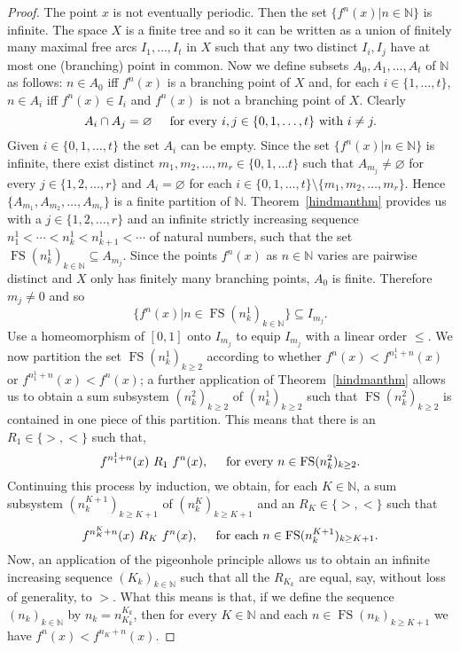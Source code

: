 \documentclass[12pt]{amsart}
\theoremstyle{definition}
\numberwithin{equation}{section}
\DeclareMathOperator{\fs}{FS}
\begin{document}
\begin{proof}
 The point $x$ is not eventually periodic. Then the set $\{f^n(x)\big|n\in\mathbb N\}$ is infinite. The space $X$ is a finite tree and so it can be written as a union of finitely many maximal free arcs $I_1,\ldots,I_t$
 in $X$ such that any two distinct $I_i,I_j$ have at most one (branching) point in common. Now we define subsets $A_0,A_1,\ldots,A_t$ of $\mathbb N$ as follows: $n\in A_0$ iff $f^n(x)$ is a branching point of $X$ and, for each $i\in\{1,\ldots,t\}$, $n\in A_i$ iff $f^n(x)\in I_i$ and $f^n(x)$ is not a branching point of $X.$ Clearly 
$$
A_i \cap A_j = \varnothing \hspace{.5cm} \mbox{for every } i,j\in \{0,1,\ldots,t\} \mbox{ with } i \ne j.
$$ 
Given $i \in \{0,1,\ldots,t\}$ the set $A_i$ can be empty. Since the set $\{f^n(x)\big|n\in\mathbb N\}$ is infinite, there exist distinct $m_1,m_2,\ldots,m_r \in \{0,1,\ldots t\}$ such that $A_{m_j} \neq\varnothing$ for every  
$j \in \{1,2,\ldots,r\}$ and $A_i = \varnothing$ for each $i \in \{0,1,\ldots,t\}\setminus \{m_1,m_2,\ldots,m_r\}$. Hence 
$\{A_{m_1},A_{m_2},\ldots,A_{m_r}\}$ is a finite partition of $\mathbb N$. Theorem~\ref{hindmanthm} provides us with a $j\in\{1,2,\ldots,r\}$ and an infinite strictly increasing sequence $n_1^1<\cdots<n_k^1<n_{k+1}^1<\cdots$ of natural numbers, such that the set $\fs(n_k^1)_{k\in\mathbb N}\subseteq A_{m_j}$. Since the points $f^n(x)$ as $n\in\mathbb N$ varies are pairwise distinct and $X$ only has finitely many branching points, $A_0$ is finite. Therefore $m_j\neq 0$ and so
\begin{equation*}
\{f^n(x)\big|n\in\fs(n_k^1)_{k\in\mathbb N}\}\subseteq I_{m_j}.
\end{equation*}
Use a homeomorphism of $[0,1]$ onto $I_{m_j}$ to equip $I_{m_j}$ with a linear order $\leq$. We now partition 
the set $\fs(n_k^1)_{k\geq 2}$ according to whether $f^n(x)<f^{n_1^1+n}(x)$ or $f^{n_1^1+n}(x)<f^n(x)$; a further application of Theorem~\ref{hindmanthm} allows us to obtain a sum subsystem $(n_k^2)_{k\geq 2}$ of 
$(n_k^1)_{k\geq 2}$ such that $\fs(n_k^2)_{k\geq 2}$ is contained in one piece of this partition. This means that 
there is an $R_1\in\{>,<\}$ such that, 
$$
f^{n_1^1+n}(x)\ R_1\ f^n(x), \hspace{.5cm} \mbox{for every } n\in\fs(n_k^2)_{k\geq 2}.
$$
Continuing this process by induction, we obtain, for each $K\in\mathbb N$, a sum subsystem $(n_k^{K+1})_{k\geq K+1}$ of $(n_k^K)_{k\geq K+1}$ and an $R_K\in\{>,<\}$ such that
$$
f^{n_K^K+n}(x)\ R_K\ f^n(x), \hspace{.5cm} \mbox{for each } n\in\fs(n_k^{K+1})_{k\geq K+1}.
$$
Now, an application of the pigeonhole principle allows us to obtain an infinite increasing sequence $(K_k)_{k\in\mathbb N}$ such that all the $R_{K_k}$ are equal, say, without loss of generality, to $>$. What this means is that, if we define the sequence $(n_k)_{k\in\mathbb N}$ by $n_k=n_{K_k}^{K_k}$, then for every $K\in\mathbb N$ and each $n\in\fs(n_k)_{k\geq K+1}$ we have $f^n(x)<f^{n_K+n}(x)$.


\end{proof}
\end{document}
